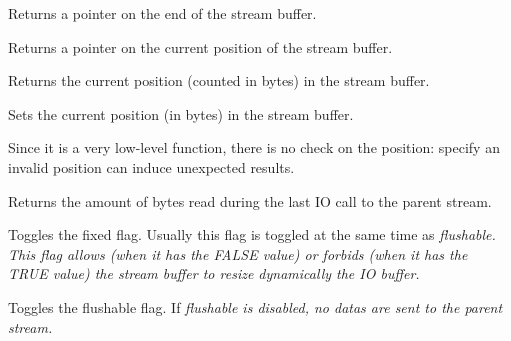 

Returns a pointer on the end of the stream buffer.



Returns a pointer on the current position of the stream buffer.



Returns the current position (counted in bytes) in the stream buffer.



Sets the current position (in bytes) in the stream buffer.


Since it is a very low-level function, there is no check on the position:
specify an invalid position can induce unexpected results.



Returns the amount of bytes read during the last IO call to the parent stream.

\label{wxstreambufferfixed}


Toggles the fixed flag. Usually this flag is toggled at the same time as 
\it{flushable}. This flag allows (when it has the FALSE value) or forbids
(when it has the TRUE value) the stream buffer to resize dynamically the IO buffer.



\label{wxstreambufferflushable}


Toggles the flushable flag. If \it{flushable} is disabled, no datas are sent
to the parent stream.


